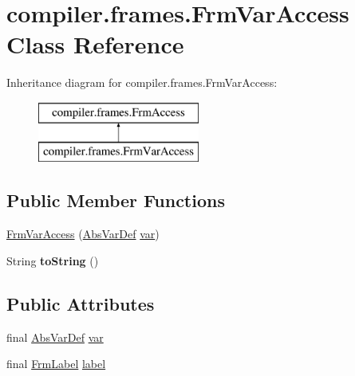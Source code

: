 \hypertarget{classcompiler_1_1frames_1_1_frm_var_access}{}\section{compiler.\+frames.\+Frm\+Var\+Access Class Reference}
\label{classcompiler_1_1frames_1_1_frm_var_access}
Inheritance diagram for compiler.\+frames.\+Frm\+Var\+Access\+:\begin{figure}[H]
\begin{center}
\leavevmode
\includegraphics[height=2.000000cm]{classcompiler_1_1frames_1_1_frm_var_access}
\end{center}
\end{figure}
\subsection*{Public Member Functions}
\begin{DoxyCompactItemize}
\item 
\hyperlink{classcompiler_1_1frames_1_1_frm_var_access_a53b7c22439429fabf33f85f7d3dd584d}{Frm\+Var\+Access} (\hyperlink{classcompiler_1_1abstr_1_1tree_1_1def_1_1_abs_var_def}{Abs\+Var\+Def} \hyperlink{classcompiler_1_1frames_1_1_frm_var_access_aa9895a335450c7c006d8f47d56a3c843}{var})
\item 
\mbox{\label{classcompiler_1_1frames_1_1_frm_var_access_a9413d77874f81ab84ec873d0ff453b38}} 
String {\bfseries to\+String} ()
\end{DoxyCompactItemize}
\subsection*{Public Attributes}
\begin{DoxyCompactItemize}
\item 
final \hyperlink{classcompiler_1_1abstr_1_1tree_1_1def_1_1_abs_var_def}{Abs\+Var\+Def} \hyperlink{classcompiler_1_1frames_1_1_frm_var_access_aa9895a335450c7c006d8f47d56a3c843}{var}
\item 
final \hyperlink{classcompiler_1_1frames_1_1_frm_label}{Frm\+Label} \hyperlink{classcompiler_1_1frames_1_1_frm_var_access_aa1b039b4a9029849e100486b045ecd3c}{label}
\end{DoxyCompactItemize}



